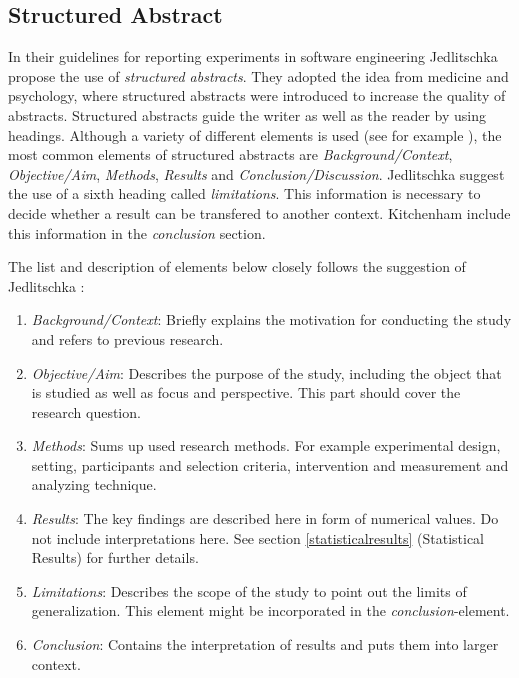 
\subsection{Structured Abstract}
\label{subsec:structured abstract}

In their guidelines for reporting experiments in software engineering Jedlitschka \etal \cite{Jedlitschka2008} propose the use of \emph{structured abstracts}. They adopted the idea from medicine and psychology, where structured abstracts were introduced to increase the quality of abstracts. Structured abstracts guide the writer as well as the reader by using headings. Although a variety of different elements is used (see for example \todo{} ), the most common elements of structured abstracts are \emph{Background/Context}, \emph{Objective/Aim}, \emph{Methods}, \emph{Results} and \emph{Conclusion/Discussion}. Jedlitschka \etal \cite{Jedlitschka2008} suggest the use of a sixth heading called \emph{limitations}. This information is necessary to decide whether a result can be transfered to another context. Kitchenham \etal \cite{KBO2008} include this information in the \emph{conclusion} section.

The list and description of elements below closely follows the suggestion of Jedlitschka \etal \cite{Jedlitschka2008}:
\begin{enumerate}
	\item \emph{Background/Context}: Briefly explains the motivation for conducting the study and refers to previous research.
	\item \emph{Objective/Aim}: Describes the purpose of the study, including the object that is studied as well as focus and perspective. This part should cover the research question.
	\item \emph{Methods}: Sums up used research methods. For example experimental design, setting, participants and selection criteria, intervention and measurement and analyzing technique.
	\item \emph{Results}: The key findings are described here in form of numerical values. Do not include interpretations here. See section \ref{statisticalresults} (Statistical Results) for further details.
	\item \emph{Limitations}: Describes the scope  of the study to point out the limits of generalization. This element might be incorporated in the \emph{conclusion}-element.
	\item \emph{Conclusion}:  Contains the interpretation of results and puts them into larger context.
\end{enumerate}

